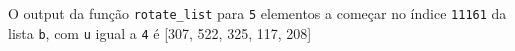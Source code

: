 \documentclass[12pt,varwidth=16cm,border=1pt]{standalone}
\begin{document}
O output da função \verb+rotate_list+ para \verb+5+ elementos a começar no índice \verb+11161+ da lista \verb+b+, com \verb+u+ igual a \verb+4+ é [307, 522, 325, 117, 208] 

\questiomfalse
\end{document}

